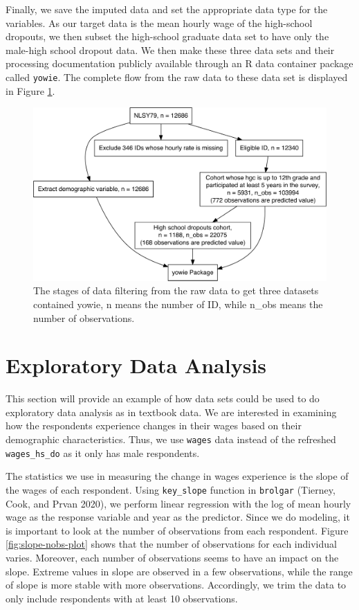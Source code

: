 \documentclass{article}
\begin{document}
Finally, we save the imputed data and set the appropriate data type for the variables. As our target data is the mean hourly wage of the high-school dropouts, we then subset the high-school graduate data set to have only the male-high school dropout data. We then make these three data sets and their processing documentation publicly available through an R data container package called \texttt{yowie}. The complete flow from the raw data to these data set is displayed in Figure \ref{fig:flow-chart}.

\begin{figure}

{\centering \includegraphics[width=468px]{figures/flow-chart-1} 

}

\caption{The stages of data filtering from the raw data to get three datasets contained yowie, n means the number of ID, while n\_obs means the number of observations.}\label{fig:flow-chart}
\end{figure}

\hypertarget{eda}{%
\section{Exploratory Data Analysis}\label{eda}}

This section will provide an example of how data sets could be used to do exploratory data analysis as in textbook data. We are interested in examining how the respondents experience changes in their wages based on their demographic characteristics. Thus, we use \texttt{wages} data instead of the refreshed \texttt{wages\_hs\_do} as it only has male respondents.

The statistics we use in measuring the change in wages experience is the slope of the wages of each respondent.
Using \texttt{key\_slope} function in \texttt{brolgar} (Tierney, Cook, and Prvan 2020), we perform linear regression with the log of mean hourly wage as the response variable and year as the predictor. Since we do modeling, it is important to look at the number of observations from each respondent. Figure \ref{fig:slope-nobs-plot} shows that the number of observations for each individual varies. Moreover, each number of observations seems to have an impact on the slope. Extreme values in slope are observed in a few observations, while the range of slope is more stable with more observations. Accordingly, we trim the data to only include respondents with at least 10 observations.
\end{document}
